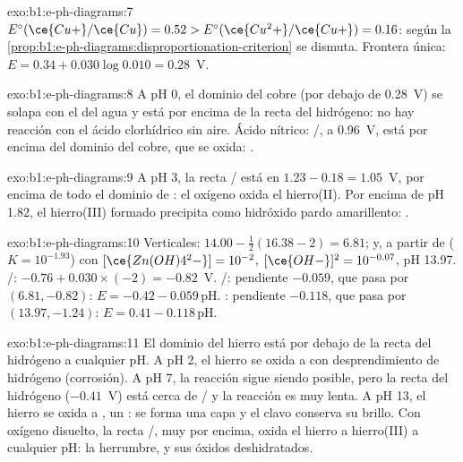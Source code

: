 \begin{solution}{exo:b1:e-ph-diagrams:7}
$E^\circ(\ce{Cu+}/\ce{Cu}) = 0.52 > E^\circ(\ce{Cu^2+}/\ce{Cu+}) = 0.16$:
según la
\cref{prop:b1:e-ph-diagrams:disproportionation-criterion} 
se dismuta. Frontera única: $E = 0.34 + 0.030\log 0.010 =
0.28$~V.
\end{solution}

\begin{solution}{exo:b1:e-ph-diagrams:8}
A pH 0, el dominio del cobre (por debajo de 0.28~V) se solapa con el del
agua y está por encima de la recta del hidrógeno: no hay reacción con el
ácido clorhídrico sin aire. Ácido nítrico: /, a 0.96~V,
está por encima del dominio del cobre, que se oxida:
.
\end{solution}

\begin{solution}{exo:b1:e-ph-diagrams:9}
A pH 3, la recta / está en $1.23 - 0.18 = 1.05$~V, por
encima de todo el dominio de : el oxígeno oxida el hierro(II).
Por encima de pH 1.82, el hierro(III) formado precipita como hidróxido
pardo amarillento:
.
\end{solution}

\begin{solution}{exo:b1:e-ph-diagrams:10}
Verticales: $14.00 - \frac12(16.38 - 2) = 6.81$; y, a partir de
 ($K = 10^{-1.93}$) con
$[\ce{Zn(OH)4^2-}] = 10^{-2}$, $[\ce{OH-}]^2 = 10^{-0.07}$, pH 13.97.
/: $-0.76 + 0.030 \times (-2) = -0.82$~V. /:
pendiente $-0.059$, que pasa por $(6.81, -0.82)$:
$E = -0.42 - 0.059\,\mathrm{pH}$.
: pendiente $-0.118$, que pasa
por $(13.97, -1.24)$: $E = 0.41 - 0.118\,\mathrm{pH}$.
\end{solution}

\begin{solution}{exo:b1:e-ph-diagrams:11}
El dominio del hierro está por debajo de la recta del hidrógeno a
cualquier pH. A pH 2, el hierro se oxida a  con desprendimiento
de hidrógeno (corrosión). A pH 7, la reacción sigue siendo posible, pero
la recta del hidrógeno ($-0.41$~V) está cerca de / y la
reacción es muy lenta. A pH 13, el hierro se oxida a , un
: se forma una capa y el clavo conserva su brillo.
Con oxígeno disuelto, la recta /, muy por encima, oxida el
hierro a hierro(III) a cualquier pH: la herrumbre,  y sus
óxidos deshidratados.
\end{solution}

